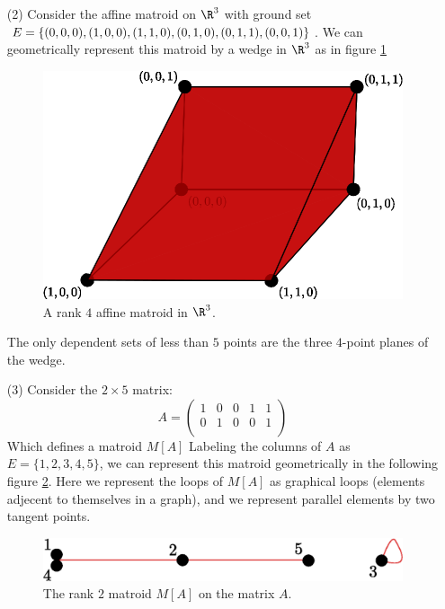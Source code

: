 \begin{example}
\begin{enumerate}
        \item[(2)] Consider the affine matroid on $\R^3$ with ground set
            $E=\{(0,0,0), (1,0,0), (1,1,0), (0,1,0), (0,1,1), \\ (0,0,1)\}$. We
            can geometrically represent this matroid by a wedge in $\R^3$ as in
            figure \ref{fig_1.10}
             \begin{figure}[h]
                \centering
                \includegraphics[scale=0.8]{Figures/chapter1/rank_4_affine.eps}
                \caption{A rank $4$ affine matroid in  $\R^3$.}
                \label{fig_1.10}
            \end{figure}
            The only dependent sets of less than $5$ points are the three
            $4$-point planes of the wedge.

        \item[(3)] Consider the $2 \times 5$ matrix:
            \begin{equation*}
                A=\begin{pmatrix}
                    1   &   0   &   0   &   1   &   1   \\
                    0   &   1   &   0   &   0   &   1   \\
                  \end{pmatrix}
            \end{equation*}
            Which defines a matroid $M[A]$ Labeling the columns of $A$ as
            $E=\{1,2,3,4,5\}$, we can represent this matroid geometrically in the
            following figure \ref{fig_1.11}. Here we represent the loops of $M[A]$ as
            graphical loops (elements adjecent to themselves in a graph), and we
            represent parallel elements by two tangent points.
            \begin{figure}[h]
                \centering
                \includegraphics[scale=0.8]{Figures/chapter1/rank_2_matroid.eps}
                \caption{The rank $2$ matroid $M[A]$ on the matrix $A$.}
                \label{fig_1.11}
            \end{figure}
    \end{enumerate}
\end{example}

